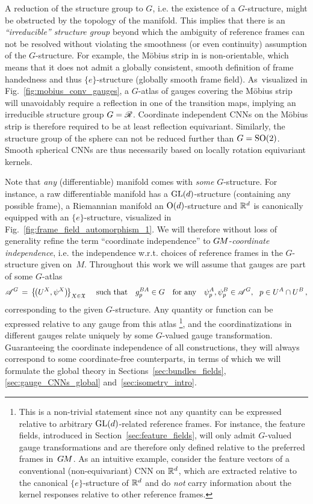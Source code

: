 A reduction of the structure group to $G$, i.e. the existence of a $G$-structure, might be obstructed by the topology of the manifold.
This implies that there is an \emph{``irreducible'' structure group} beyond which the ambiguity of reference frames can not be resolved without violating the smoothness (or even continuity) assumption of the $G$-structure.
For example, the M\"obius strip in is non-orientable, which means that it does not admit a globally consistent, smooth definition of frame handedness and thus $\{e\}$-structure (globally smooth frame field).
As~visualized in Fig.~\ref{fig:mobius_conv_gauges}, a $G$-atlas of gauges covering the M\"obius strip will unavoidably require a reflection in one of the transition maps, implying an irreducible structure group $G=\mathscr{R}$.
Coordinate independent CNNs on the M{\"o}bius strip is therefore required to be at least reflection equivariant.
Similarly, the structure group of the sphere can not be reduced further than ${G=\operatorname{SO}(2)}$.
Smooth spherical CNNs are thus necessarily based on locally rotation equivariant kernels.


Note that \emph{any} (differentiable) manifold comes with \emph{some} $G$-structure.
For instance, a raw differentiable manifold has a $\operatorname{GL}(d)$-structure (containing any possible frame), a Riemannian manifold an $\operatorname{O}(d)$-structure and $\mathbb{R}^d$ is canonically equipped with an $\{e\}$-structure, visualized in Fig.~\ref{fig:frame_field_automorphism_1}.
We will therefore without loss of generality refine the term ``coordinate independence'' to $G\mkern-1.4muM$-\emph{coordinate independence}, i.e. the independence w.r.t. choices of reference frames in the $G$-structure given on~$M$.
Throughout this work we will assume that gauges are part of some $G$-atlas
\begin{align}\label{eq:G_atlas_dfn}
    \mathscr{A}^G \,=\, \big\{\! \big(U^X, \psi^X\big) \!\big\}_{X\in \mathfrak{X}}
    \quad\ \textup{such that} \quad
    g_p^{BA} \in G
    \quad \textup{for any}\ \ \ \psi_p^A, \psi_p^B \in \mathscr{A}^G,\ \ p\in U^A\cap U^B \,,
\end{align}
corresponding to the given $G$-structure.
Any quantity or function can be expressed relative to any gauge from this atlas%
\footnote{
    This is a non-trivial statement since not any quantity can be expressed relative to arbitrary $\operatorname{GL}(d)$-related reference frames.
    For instance, the feature fields, introduced in Section~\ref{sec:feature_fields}, will only admit $G$-valued gauge transformations and are therefore only defined relative to the preferred frames in~$G\mkern-1.4muM$.
    As an intuitive example, consider the feature vectors of a conventional (non-equivariant) CNN on $\mathbb{R}^d$, which are extracted relative to the canonical $\{e\}$-structure of $\mathbb{R}^d$ and do \emph{not} carry information about the kernel responses relative to other reference frames.
},
and the coordinatizations in different gauges relate uniquely by some $G$-valued gauge transformation.
Guaranteeing the coordinate independence of all constructions, they will always correspond to some coordinate-free counterparts, in terms of which we will formulate the global theory in Sections~\ref{sec:bundles_fields}, \ref{sec:gauge_CNNs_global} and~\ref{sec:isometry_intro}.
